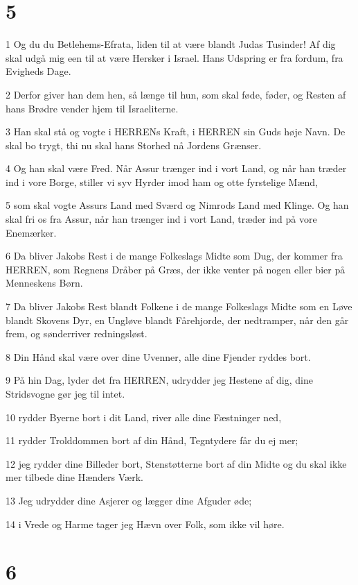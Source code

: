 \chapter{5}

\par 1 Og du du Betlehems-Efrata, liden til at være blandt Judas Tusinder! Af dig skal udgå mig een til at være Hersker i Israel. Hans Udspring er fra fordum, fra Evigheds Dage.
\par 2 Derfor giver han dem hen, så længe til hun, som skal føde, føder, og Resten af hans Brødre vender hjem til Israeliterne.
\par 3 Han skal stå og vogte i HERRENs Kraft, i HERREN sin Guds høje Navn. De skal bo trygt, thi nu skal hans Storhed nå Jordens Grænser.
\par 4 Og han skal være Fred. Når Assur trænger ind i vort Land, og når han træder ind i vore Borge, stiller vi syv Hyrder imod ham og otte fyrstelige Mænd,
\par 5 som skal vogte Assurs Land med Sværd og Nimrods Land med Klinge. Og han skal fri os fra Assur, når han trænger ind i vort Land, træder ind på vore Enemærker.
\par 6 Da bliver Jakobs Rest i de mange Folkeslags Midte som Dug, der kommer fra HERREN, som Regnens Dråber på Græs, der ikke venter på nogen eller bier på Menneskens Børn.
\par 7 Da bliver Jakobs Rest blandt Folkene i de mange Folkeslags Midte som en Løve blandt Skovens Dyr, en Ungløve blandt Fårehjorde, der nedtramper, når den går frem, og sønderriver redningsløst.
\par 8 Din Hånd skal være over dine Uvenner, alle dine Fjender ryddes bort.
\par 9 På hin Dag, lyder det fra HERREN, udrydder jeg Hestene af dig, dine Stridsvogne gør jeg til intet.
\par 10 rydder Byerne bort i dit Land, river alle dine Fæstninger ned,
\par 11 rydder Trolddommen bort af din Hånd, Tegntydere får du ej mer;
\par 12 jeg rydder dine Billeder bort, Stenstøtterne bort af din Midte og du skal ikke mer tilbede dine Hænders Værk.
\par 13 Jeg udrydder dine Asjerer og lægger dine Afguder øde;
\par 14 i Vrede og Harme tager jeg Hævn over Folk, som ikke vil høre.

\chapter{6}

